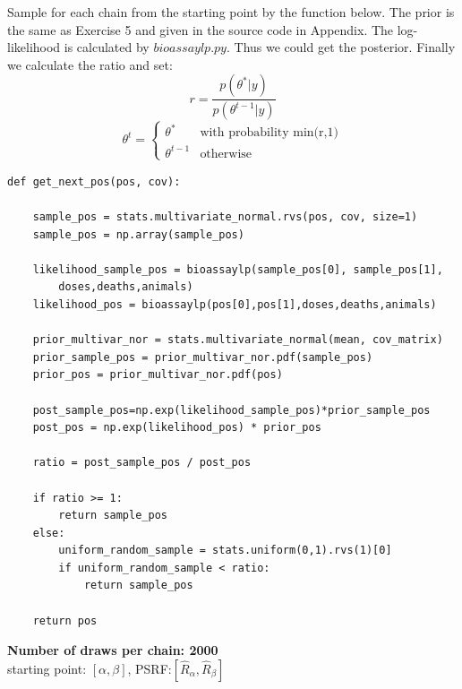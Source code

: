 \documentclass{article}
\begin{document}
Sample for each chain from the starting point by the function below. The prior is the same as Exercise 5 and given in the source code in Appendix. The log-likelihood is calculated by $bioassaylp.py$. Thus we could get the posterior. Finally we calculate the ratio and set:
\begin{equation}
r=\frac{p(\theta^*|y)}{p(\theta^{t-1}|y)}
\end{equation}
\begin{equation}
\theta^t=\begin{cases}\theta^*&\text{with probability min(r,1)}\\ \theta^{t-1}&\text{otherwise}\end{cases}
\end{equation}

\begin{verbatim}  
def get_next_pos(pos, cov):

    sample_pos = stats.multivariate_normal.rvs(pos, cov, size=1)
    sample_pos = np.array(sample_pos)

    likelihood_sample_pos = bioassaylp(sample_pos[0], sample_pos[1],
    	doses,deaths,animals)
    likelihood_pos = bioassaylp(pos[0],pos[1],doses,deaths,animals)

    prior_multivar_nor = stats.multivariate_normal(mean, cov_matrix)
    prior_sample_pos = prior_multivar_nor.pdf(sample_pos)
    prior_pos = prior_multivar_nor.pdf(pos)

    post_sample_pos=np.exp(likelihood_sample_pos)*prior_sample_pos
    post_pos = np.exp(likelihood_pos) * prior_pos

    ratio = post_sample_pos / post_pos

    if ratio >= 1:
        return sample_pos
    else:
        uniform_random_sample = stats.uniform(0,1).rvs(1)[0]
        if uniform_random_sample < ratio:
            return sample_pos 

    return pos
\end{verbatim}

\textbf{Number of draws per chain: 2000}\\

starting point: $[\alpha,\beta]$, PSRF:$[\hat{R}_{\alpha},\hat{R}_{\beta}]$\\
\end{document}
